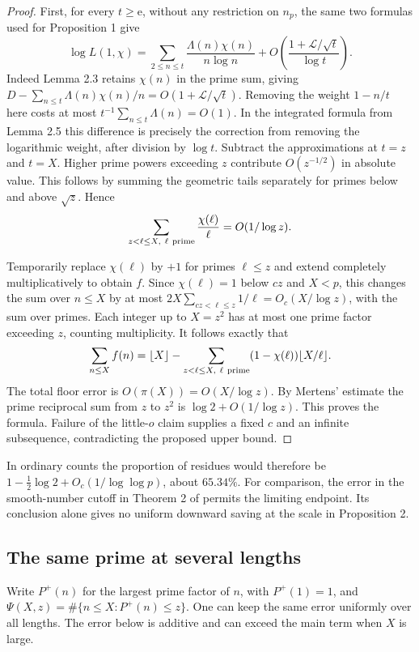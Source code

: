 \documentclass[11pt]{article}
\newcommand{\LL}{\mathcal L}
\newcommand{\e}{\mathrm e}
\begin{document}
\begin{proof}
First, for every $t\ge\e$, without any restriction on $n_p$, the same
two formulas used for Proposition 1 give
\[
 \log L(1,\chi)
 =\sum_{2\le n\le t}\frac{\Lambda(n)\chi(n)}{n\log n}
 +O\!\left(\frac{1+\LL/\sqrt t}{\log t}\right).
\]
Indeed Lemma 2.3 retains $\chi(n)$ in the prime sum, giving
$D-\sum_{n\le t}\Lambda(n)\chi(n)/n=O(1+\LL/\sqrt t)$.
Removing the weight $1-n/t$ here costs at most
$t^{-1}\sum_{n\le t}\Lambda(n)=O(1)$. In the integrated formula from
Lemma 2.5 this difference is precisely the correction from removing
the logarithmic weight, after division by $\log t$. Subtract the
approximations at $t=z$ and $t=X$. Higher prime powers exceeding $z$
contribute $O(z^{-1/2})$ in absolute value. This follows by summing the
geometric tails separately for primes below and above $\sqrt z$. Hence
\[
 \sum_{z<\ell\le X,\ \ell\ {\rm prime}}\frac{\chi(\ell)}{\ell}
 =O(1/\log z).
\]

Temporarily replace $\chi(\ell)$ by $+1$ for primes $\ell\le z$ and
extend completely multiplicatively to obtain $f$. Since $\chi(\ell)=1$
below $cz$ and $X<p$, this changes the sum over $n\le X$ by at most
$2X\sum_{cz<\ell\le z}1/\ell=O_c(X/\log z)$, with the sum over primes.
Each integer up to $X=z^2$ has at most one prime factor exceeding $z$,
counting multiplicity. It follows exactly that
\[
 \sum_{n\le X} f(n)=\lfloor X\rfloor-
 \sum_{z<\ell\le X,\ \ell\ {\rm prime}}(1-\chi(\ell))\lfloor X/\ell\rfloor .
\]
The total floor error is $O(\pi(X))=O(X/\log z)$. By Mertens' estimate
the prime reciprocal sum from $z$ to $z^2$ is $\log 2+O(1/\log z)$.
This proves the formula. Failure of the little-$o$ claim supplies a
fixed $c$ and an infinite subsequence, contradicting the proposed upper bound.
\end{proof}

In ordinary counts the proportion of residues would therefore be
$1-\tfrac12\log 2+O_c(1/\log\log p)$, about $65.34\%$.
For comparison, the error in the smooth-number cutoff in Theorem 2
of \cite{gs} permits the limiting endpoint. Its conclusion alone gives
no uniform downward saving at the scale in Proposition 2.

\subsection*{The same prime at several lengths}
Write $P^+(n)$ for the largest prime factor of $n$, with $P^+(1)=1$,
and $\Psi(X,z)=\#\{n\le X:P^+(n)\le z\}$. One can keep the same
error uniformly over all lengths. The error below is additive and
can exceed the main term when $X$ is large.
\end{document}
